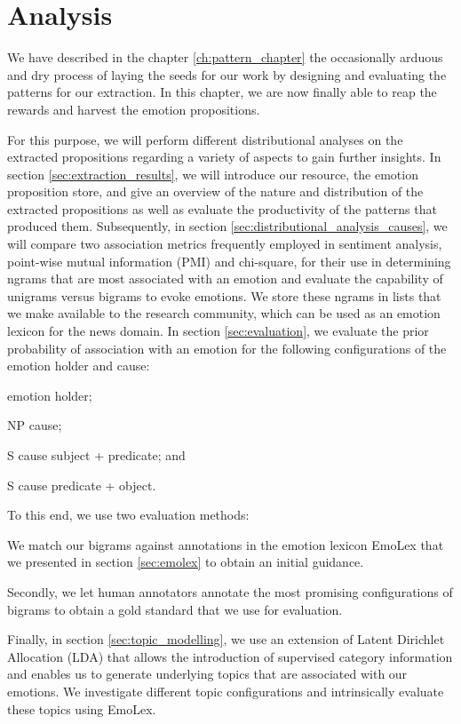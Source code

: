 
\chapter{Analysis} %

\label{ch:analysis} %

We have described in the chapter \ref{ch:pattern_chapter} the occasionally arduous and dry process of laying the seeds for our work by designing and evaluating the patterns for our extraction. In this chapter, we are now finally able to reap the rewards and harvest the emotion propositions.

For this purpose, we will perform different distributional analyses on the extracted propositions regarding a variety of aspects to gain further insights. In section \ref{sec:extraction_results}, we will introduce our resource, the emotion proposition store, and give an overview of the nature and distribution of the extracted propositions as well as evaluate the productivity of the patterns that produced them. Subsequently, in section \ref{sec:distributional_analysis_causes}, we will compare two association metrics frequently employed in sentiment analysis, point-wise mutual information (PMI) and chi-square, for their use in determining ngrams that are most associated with an emotion and evaluate the capability of unigrams versus bigrams to evoke emotions. We store these ngrams in lists that we make available to the research community, which can be used as an emotion lexicon for the news domain. In section \ref{sec:evaluation}, we evaluate the prior probability of association with an emotion for the following configurations of the emotion holder and cause:\begin{inparaenum} \item emotion holder; \item NP cause; \item S cause subject + predicate; and \item S cause predicate + object. \end{inparaenum} To this end, we use two evaluation methods:\begin{inparaenum} \item We match our bigrams against annotations in the emotion lexicon EmoLex \cite{nrc_emolex} that we presented in section \ref{sec:emolex} to obtain an initial guidance. \item Secondly, we let human annotators annotate the most promising configurations of bigrams to obtain a gold standard that we use for evaluation. \end{inparaenum} Finally, in section \ref{sec:topic_modelling}, we use an extension of Latent Dirichlet Allocation (LDA) that allows the introduction of supervised category information and enables us to generate underlying topics that are associated with our emotions. We investigate different topic configurations and intrinsically evaluate these topics using EmoLex.

